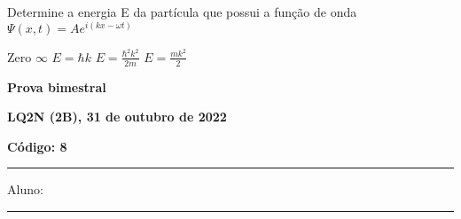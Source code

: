 \documentclass[12pt, addpoints]{exam}
\begin{document}
        \begin{questions}
\begin{multicols*}{2}
\question[20] Determine a energia E da partícula que possui a função de onda $\Psi(x,t)=Ae^{i(kx-\omega t)}$

\begin{choices}
\choice Zero \choice $\infty$ \choice $E=\hbar k$ \choice $E=\frac{\hbar^2k^2}{2m}$ \choice $E = \frac{mk^2}{2}$ \end{choices}
\end{multicols*}
\end{questions}
\newpage
        \begin{minipage}[b]{0.75\linewidth}
            \begin{flushleft}
                {\bf \large Prova bimestral}
            \end{flushleft}
            \begin{flushleft}
                {\bf \large LQ2N (2B), 31 de outubro de 2022}
            \end{flushleft}
        \end{minipage}
        \begin{minipage}[b]{0.20\linewidth}
            \begin{flushright}
                {\bf \large Código: 8}
            \end{flushright}
        \end{minipage}
        \vspace{0.5cm} \hrule \vspace{0.5cm}
        \begin{minipage}{0.75\linewidth}
            Aluno:
        \end{minipage}
        \vspace{0.5cm} \hrule \vspace{0.5cm}
\end{document}
